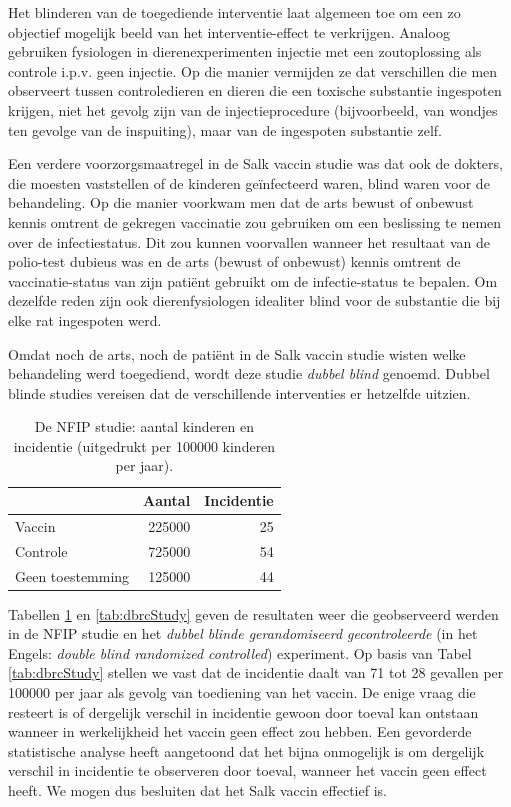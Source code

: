 \documentclass[
  12pt,dutch,coursenotes]{book}
\begin{document}
Het blinderen van de toegediende interventie laat algemeen toe om een zo objectief mogelijk
beeld van het interventie-effect te verkrijgen. Analoog gebruiken fysiologen in dierenexperimenten injectie met een zoutoplossing als controle i.p.v. geen injectie. Op die manier vermijden ze dat verschillen die men observeert tussen controledieren en dieren die een toxische substantie ingespoten krijgen, niet het gevolg zijn van de injectieprocedure (bijvoorbeeld, van wondjes ten gevolge van de inspuiting), maar van de ingespoten substantie zelf.

Een verdere voorzorgsmaatregel in de Salk vaccin studie was dat ook de
dokters, die moesten vaststellen of de kinderen geïnfecteerd waren,
blind waren voor de behandeling. Op die manier voorkwam men dat de arts
bewust of onbewust kennis omtrent de gekregen vaccinatie zou gebruiken om
een beslissing te nemen over de infectiestatus. Dit zou kunnen voorvallen
wanneer het resultaat van de polio-test dubieus was en de arts (bewust of
onbewust) kennis omtrent de vaccinatie-status van zijn patiënt gebruikt om
de infectie-status te bepalen. Om dezelfde reden zijn ook dierenfysiologen idealiter blind voor de substantie die bij elke rat ingespoten werd.

Omdat noch de arts, noch de patiënt in de Salk vaccin studie wisten welke
behandeling werd toegediend, wordt deze studie \emph{dubbel blind}
genoemd. Dubbel blinde studies vereisen dat de verschillende interventies er
hetzelfde uitzien.

\begin{table}

\caption{\label{tab:nfipStudy}De NFIP studie: aantal kinderen en incidentie (uitgedrukt per
100000 kinderen per jaar).}
\centering
\begin{tabular}[t]{lrr}
\toprule
  & Aantal & Incidentie\\
\midrule
Vaccin & 225000 & 25\\
Controle & 725000 & 54\\
Geen toestemming & 125000 & 44\\
\bottomrule
\end{tabular}
\end{table}

Tabellen \ref{tab:nfipStudy} en \ref{tab:dbrcStudy} geven de resultaten weer die geobserveerd
werden in de NFIP studie en het \emph{dubbel blinde gerandomiseerd
gecontroleerde} (in het Engels: \emph{double blind randomized controlled})
experiment. Op basis van Tabel \ref{tab:dbrcStudy} stellen we vast dat de incidentie
daalt van 71 tot 28 gevallen per 100000 per jaar als gevolg van
toediening van het vaccin. De enige vraag die resteert is of dergelijk
verschil in incidentie gewoon door toeval kan ontstaan wanneer in
werkelijkheid het vaccin geen effect zou hebben. Een gevorderde statistische analyse heeft aangetoond dat het bijna onmogelijk is om dergelijk verschil in incidentie
te observeren door toeval, wanneer het vaccin geen effect heeft. We mogen
dus besluiten dat het Salk vaccin effectief is.
\end{document}
